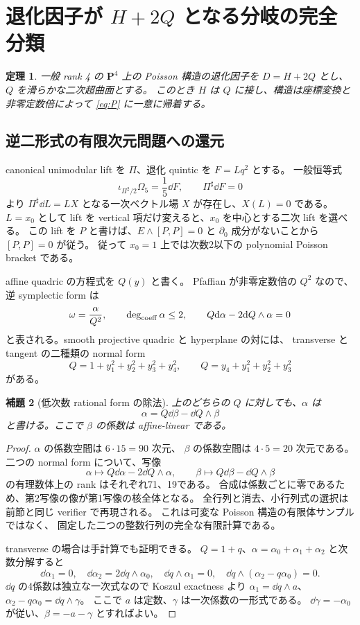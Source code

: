 \documentclass[11pt,a4paper]{ltjsarticle}
\newcommand{\PP}{\mathbf P}\renewcommand{\AA}{\mathbf A}\newcommand{\CC}{\mathbf C}\newcommand{\QQ}{\mathbf Q}
\newtheorem{theorem}{定理}[section]\newtheorem{proposition}[theorem]{命題}\newtheorem{lemma}[theorem]{補題}\newtheorem{corollary}[theorem]{系}
\theoremstyle{remark}\newtheorem{remark}[theorem]{注意}\renewcommand{\proofname}{証明}
\begin{document}
\section{退化因子が \texorpdfstring{$H+2Q$}{H+2Q} となる分岐の完全分類}\label{sec:quadric}
\begin{theorem}\label{thm:quadric}
一般 rank 4 の $\PP^4$ 上の Poisson 構造の退化因子を
$D=H+2Q$ とし、$Q$ を滑らかな二次超曲面とする。
このとき $H$ は $Q$ に接し、構造は座標変換と非零定数倍によって
\eqref{eq:P} に一意に帰着する。
\end{theorem}

\subsection{逆二形式の有限次元問題への還元}
canonical unimodular lift を $\Pi$、退化 quintic を $F=Lq^2$ とする。
一般恒等式
\[
 \iota_{\Pi^2/2}\Omega_5=\frac15\dd F,\qquad \Pi^\sharp\dd F=0
\]
より $\Pi^\sharp\dd L=LX$ となる一次ベクトル場 $X$ が存在し、$X(L)=0$ である。
$L=x_0$ として lift を vertical 項だけ変えると、$x_0$ を中心とする二次 lift を選べる。
この lift を $P$ と書けば、$E\wedge[P,P]=0$ と $\partial_0$ 成分がないことから
$[P,P]=0$ が従う。
従って $x_0=1$ 上では次数2以下の polynomial Poisson bracket である。

affine quadric の方程式を $Q(y)$ と書く。
Pfaffian が非零定数倍の $Q^2$ なので、逆 symplectic form は
\[
 \omega=\frac{\alpha}{Q^2},\qquad \deg_{\rm coeff}\alpha\le2,
 \qquad Q\mathrm d\alpha-2\mathrm d Q\wedge\alpha=0
\]
と表される。smooth projective quadric と hyperplane の対には、
transverse と tangent の二種類の normal form
\[
 Q=1+y_1^2+y_2^2+y_3^2+y_4^2,\qquad
 Q=y_4+y_1^2+y_2^2+y_3^2
\]
がある。

\begin{lemma}[低次数 rational form の除法]\label{lem:primitive}
上のどちらの $Q$ に対しても、$\alpha$ は
\[
 \alpha=Q\dd\beta-\dd Q\wedge\beta
\]
と書ける。ここで $\beta$ の係数は affine-linear である。
\end{lemma}
\begin{proof}
$\alpha$ の係数空間は $6\cdot15=90$ 次元、
$\beta$ の係数空間は $4\cdot5=20$ 次元である。
二つの normal form について、写像
\[
 \alpha\longmapsto Q\dd\alpha-2\dd Q\wedge\alpha,\qquad
 \beta\longmapsto Q\dd\beta-\dd Q\wedge\beta
\]
の有理数体上の rank はそれぞれ71、19である。
合成は係数ごとに零であるため、第2写像の像が第1写像の核全体となる。
全行列と消去、小行列式の選択は前節と同じ verifier で再現される。
これは可変な Poisson 構造の有限体サンプルではなく、
固定した二つの整数行列の完全な有限計算である。

transverse の場合は手計算でも証明できる。
$Q=1+q$、$\alpha=\alpha_0+\alpha_1+\alpha_2$ と次数分解すると
\[
 \dd\alpha_1=0,\quad \dd\alpha_2=2\dd q\wedge\alpha_0,\quad
 \dd q\wedge\alpha_1=0,\quad
 \dd q\wedge(\alpha_2-q\alpha_0)=0.
\]
$\dd q$ の4係数は独立な一次式なので Koszul exactness より
$\alpha_1=\dd q\wedge a$、$\alpha_2-q\alpha_0=\dd q\wedge\gamma$。
ここで $a$ は定数、$\gamma$ は一次係数の一形式である。
$\dd\gamma=-\alpha_0$ が従い、$\beta=-a-\gamma$ とすればよい。
\end{proof}
\end{document}
